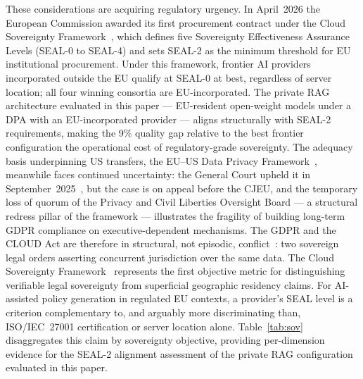 \documentclass[runningheads]{llncs}
\begin{document}
These considerations are acquiring regulatory urgency. In April~2026 the
European Commission awarded its first procurement contract under the Cloud
Sovereignty Framework~\cite{ecseal2026}, which defines five Sovereignty
Effectiveness Assurance Levels (SEAL-0 to SEAL-4) and sets SEAL-2 as the
minimum threshold for EU institutional procurement. Under this framework,
frontier AI providers incorporated outside the EU qualify at SEAL-0 at best,
regardless of server location; all four winning consortia are EU-incorporated.
The private RAG architecture evaluated in this paper --- EU-resident open-weight
models under a DPA with an EU-incorporated provider --- aligns structurally
with SEAL-2 requirements, making the 9\% quality gap relative to the best
frontier configuration the operational cost of regulatory-grade sovereignty.
The adequacy basis underpinning US transfers, the EU--US Data Privacy
Framework~\cite{dpf2023}, meanwhile faces continued uncertainty: the General
Court upheld it in September~2025~\cite{latombe2025}, but the case is on
appeal before the CJEU, and the temporary loss of quorum of the Privacy and
Civil Liberties Oversight Board --- a structural redress pillar of the
framework --- illustrates the fragility of building long-term GDPR compliance
on executive-dependent mechanisms.
The GDPR and the CLOUD Act are therefore in structural, not episodic,
conflict~\cite{schremsii2020,cloudact2018}: two sovereign legal orders
asserting concurrent jurisdiction over the same data. The Cloud Sovereignty
Framework~\cite{ecseal2026} represents the first objective metric for
distinguishing verifiable legal sovereignty from superficial geographic
residency claims. For AI-assisted policy generation in regulated EU contexts,
a provider's SEAL level is a criterion complementary to, and arguably more
discriminating than, ISO/IEC~27001 certification or server location alone.
Table~\ref{tab:sov} disaggregates this claim by sovereignty objective,
providing per-dimension evidence for the SEAL-2 alignment assessment of the private
RAG configuration evaluated in this paper.
\end{document}
